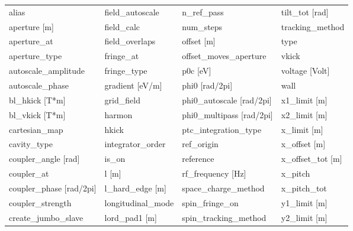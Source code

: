  \begin{tabular}{llll} \toprule
alias                          & field_autoscale                & n_ref_pass                     & tilt_tot [rad]                 \\
aperture [m]                   & field_calc                     & num_steps                      & tracking_method                \\
aperture_at                    & field_overlaps                 & offset [m]                     & type                           \\
aperture_type                  & fringe_at                      & offset_moves_aperture          & vkick                          \\
autoscale_amplitude            & fringe_type                    & p0c [eV]                       & voltage [Volt]                 \\
autoscale_phase                & gradient [eV/m]                & phi0 [rad/2pi]                 & wall                           \\
bl_hkick [T*m]                 & grid_field                     & phi0_autoscale [rad/2pi]       & x1_limit [m]                   \\
bl_vkick [T*m]                 & harmon                         & phi0_multipass [rad/2pi]       & x2_limit [m]                   \\
cartesian_map                  & hkick                          & ptc_integration_type           & x_limit [m]                    \\
cavity_type                    & integrator_order               & ref_origin                     & x_offset [m]                   \\
coupler_angle [rad]            & is_on                          & reference                      & x_offset_tot [m]               \\
coupler_at                     & l [m]                          & rf_frequency [Hz]              & x_pitch                        \\
coupler_phase [rad/2pi]        & l_hard_edge [m]                & space_charge_method            & x_pitch_tot                    \\
coupler_strength               & longitudinal_mode              & spin_fringe_on                 & y1_limit [m]                   \\
create_jumbo_slave             & lord_pad1 [m]                  & spin_tracking_method           & y2_limit [m]                   \\

\end{tabular}
